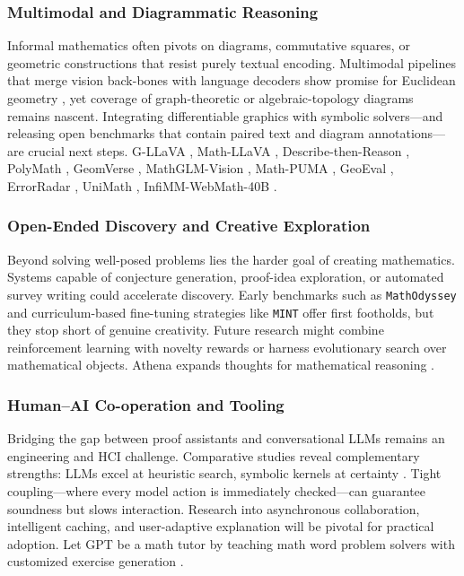 \documentclass[acmsmall,anonymous]{acmart}
\begin{document}
\subsubsection{Multimodal and Diagrammatic Reasoning}\label{sec:diagramfuture}
Informal mathematics often pivots on diagrams, commutative squares, or geometric constructions that resist purely textual encoding.  Multimodal pipelines that merge vision back-bones with language decoders show promise for Euclidean geometry \cite{zhang2024diagramformalization,shi2024mathllava}, yet coverage of graph-theoretic or algebraic-topology diagrams remains nascent.  Integrating differentiable graphics with symbolic solvers—and releasing open benchmarks that contain paired text and diagram annotations—are crucial next steps. G-LLaVA \cite{gao2023}, Math-LLaVA \cite{shi2024}, Describe-then-Reason \cite{jia2024}, PolyMath \cite{gupta2024}, GeomVerse \cite{kazemi2023}, MathGLM-Vision \cite{yang2024b}, Math-PUMA \cite{zhuang2024}, GeoEval \cite{zhang2024d}, ErrorRadar \cite{yan2024a}, UniMath \cite{liang2023a}, InfiMM-WebMath-40B \cite{han2024}.

\subsubsection{Open-Ended Discovery and Creative Exploration}\label{sec:creativefuture}
Beyond solving well-posed problems lies the harder goal of creating mathematics.  Systems capable of conjecture generation, proof-idea exploration, or automated survey writing could accelerate discovery.  Early benchmarks such as \texttt{MathOdyssey} \cite{zhang2024mathodyssey} and curriculum-based fine-tuning strategies like \texttt{MINT} \cite{li2024mint} offer first footholds, but they stop short of genuine creativity.  Future research might combine reinforcement learning with novelty rewards or harness evolutionary search over mathematical objects. Athena expands thoughts for mathematical reasoning \cite{kim2023}.

\subsubsection{Human–AI Co-operation and Tooling}\label{sec:cooperationfuture}
Bridging the gap between proof assistants and conversational LLMs remains an engineering and HCI challenge.  Comparative studies reveal complementary strengths: LLMs excel at heuristic search, symbolic kernels at certainty \cite{johnson2024llmvsitp,yang2023leandojo}.  Tight coupling—where every model action is immediately checked—can guarantee soundness but slows interaction.  Research into asynchronous collaboration, intelligent caching, and user-adaptive explanation will be pivotal for practical adoption. Let GPT be a math tutor by teaching math word problem solvers with customized exercise generation \cite{liang2023let}.
\end{document}
